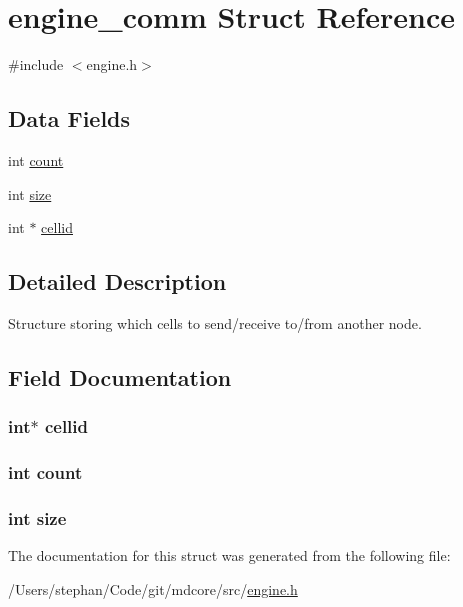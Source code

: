 \hypertarget{structengine__comm}{\section{engine\-\_\-comm Struct Reference}
\label{structengine__comm}
}


{\ttfamily \#include $<$engine.\-h$>$}

\subsection*{Data Fields}
\begin{DoxyCompactItemize}
\item 
int \hyperlink{structengine__comm_ad43c3812e6d13e0518d9f8b8f463ffcf}{count}
\item 
int \hyperlink{structengine__comm_a439227feff9d7f55384e8780cfc2eb82}{size}
\item 
int $\ast$ \hyperlink{structengine__comm_ae3e9be43b8b961b8e8bf5ff01670b75e}{cellid}
\end{DoxyCompactItemize}


\subsection{Detailed Description}
Structure storing which cells to send/receive to/from another node. 

\subsection{Field Documentation}
\hypertarget{structengine__comm_ae3e9be43b8b961b8e8bf5ff01670b75e}{
\subsubsection[{cellid}]{\setlength{\rightskip}{0pt plus 5cm}int$\ast$ cellid}}\label{structengine__comm_ae3e9be43b8b961b8e8bf5ff01670b75e}
\hypertarget{structengine__comm_ad43c3812e6d13e0518d9f8b8f463ffcf}{
\subsubsection[{count}]{\setlength{\rightskip}{0pt plus 5cm}int count}}\label{structengine__comm_ad43c3812e6d13e0518d9f8b8f463ffcf}
\hypertarget{structengine__comm_a439227feff9d7f55384e8780cfc2eb82}{
\subsubsection[{size}]{\setlength{\rightskip}{0pt plus 5cm}int size}}\label{structengine__comm_a439227feff9d7f55384e8780cfc2eb82}


The documentation for this struct was generated from the following file\-:\begin{DoxyCompactItemize}
\item 
/\-Users/stephan/\-Code/git/mdcore/src/\hyperlink{engine_8h}{engine.\-h}\end{DoxyCompactItemize}
